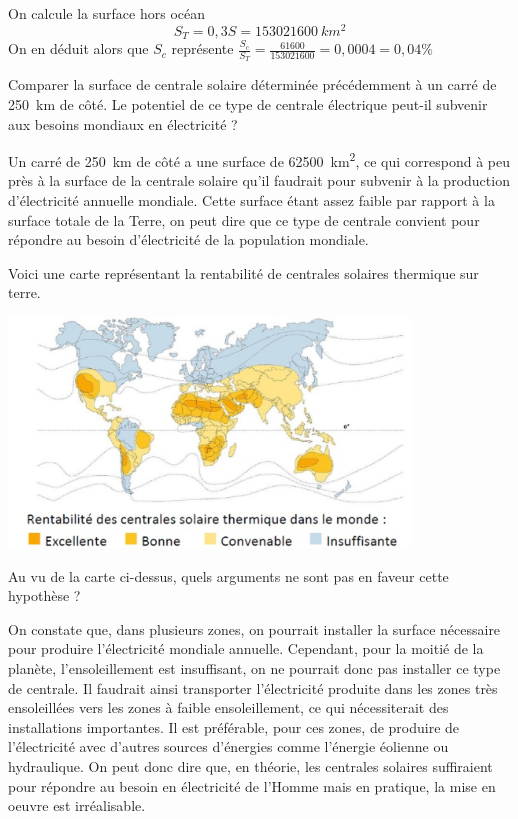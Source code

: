 \documentclass[10pt,fleqn]{article} %
\begin{document}
\begin{exercise}
\begin{solution}
        On calcule la surface hors océan $$S_T = 0,3 S = \SI{153021600}{km^2}$$
        On en déduit alors que $S_c$ représente $ \frac{S_c}{S_T} = \frac{61600}{153021600} = 0,0004 = 0,04\% $ 
    \end{solution}
    \begin{question}
        Comparer la surface de centrale solaire déterminée précédemment à un carré de \SI{250}{km} de côté. Le potentiel de ce type de centrale électrique peut-il subvenir aux besoins mondiaux en électricité ?
    \end{question}
    \begin{solution}
        Un carré de \SI{250}{km} de côté a une surface de \SI{62500}{km^2}, ce qui correspond à peu près à la surface de la centrale solaire qu’il faudrait pour subvenir à la production d’électricité annuelle mondiale. Cette surface étant assez faible par rapport à la surface totale de la Terre, on peut dire que ce type de centrale convient pour répondre au besoin d’électricité de la population mondiale.
    \end{solution}
    Voici une carte représentant la rentabilité de centrales solaires thermique sur terre. 
    \begin{center}
        \includegraphics[width=0.8\textwidth]{images/carte_ensoleillement.png}
    \end{center}
    \begin{question}
        Au vu de la carte ci-dessus, quels arguments ne sont pas en faveur cette hypothèse ?
    \end{question}
    \begin{solution}
        On constate que, dans plusieurs zones, on pourrait installer la surface nécessaire pour produire l’électricité mondiale annuelle. Cependant, pour la moitié de la planète, l’ensoleillement est insuffisant, on ne pourrait donc pas installer ce type de centrale. Il faudrait ainsi transporter l’électricité produite dans les zones très ensoleillées vers les zones à faible ensoleillement, ce qui nécessiterait des installations importantes. Il est préférable, pour ces zones, de produire de l’électricité avec d’autres sources d’énergies comme l’énergie éolienne ou hydraulique. On peut donc dire que, en théorie, les centrales solaires suffiraient pour répondre au besoin en électricité de l’Homme mais en pratique, la mise en oeuvre est irréalisable.

\end{solution}
\end{exercise}
\end{document}
